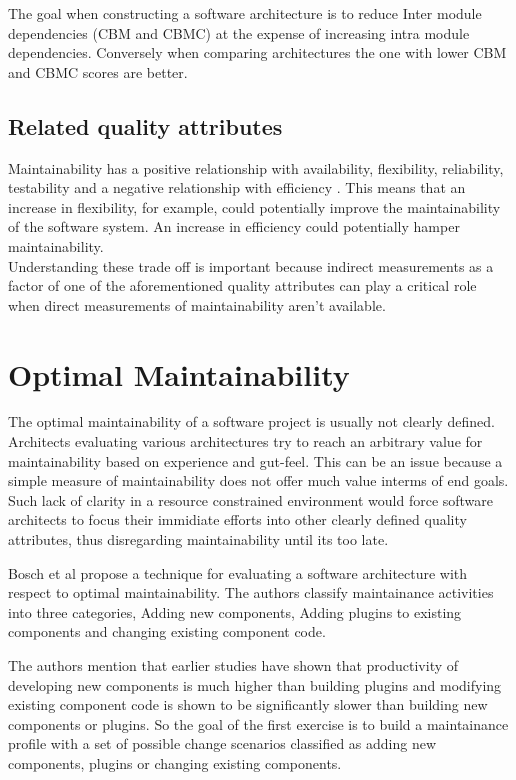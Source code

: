 \documentclass[15pt]{article}
\begin{document}
The goal when constructing a software architecture is to reduce Inter module dependencies (CBM and CBMC) at the expense of increasing intra module dependencies. Conversely when comparing architectures the one with lower CBM and CBMC scores are better.


\subsection{Related quality attributes}
Maintainability has a positive relationship with availability, flexibility, reliability, testability and a negative relationship with efficiency \cite{karl_software_2003}. This means that an increase in flexibility, for example, could potentially improve the maintainability of the software system. An increase in efficiency could potentially hamper maintainability.\\

Understanding these trade off is important because indirect measurements as a factor of one of the aforementioned quality attributes can play a critical role when direct measurements of maintainability aren't available.

\section{Optimal Maintainability}

The optimal maintainability of a software project is usually not clearly defined. Architects evaluating various architectures try to reach an arbitrary value for maintainability based on experience and gut-feel. This can be an issue because a simple measure of maintainability does not offer much value interms of end goals. Such lack of clarity in a resource constrained environment would force software architects to focus their immidiate efforts into other clearly defined quality attributes, thus disregarding maintainability until its too late.

Bosch et al \cite{bosch_assessing_2001} propose a technique for evaluating a software architecture with respect to optimal maintainability. The authors classify maintainance activities into three categories, Adding new components, Adding plugins to existing components and changing existing component code.

The authors mention that earlier studies \cite{henry_quantitative_1997} \cite{maxwell_software_1996} have shown that productivity of developing new components is much higher than building plugins and modifying existing component code is shown to be significantly slower than building new components or plugins. So the goal of the first exercise is to build a maintainance profile with a set of possible change scenarios classified as adding new components, plugins or changing existing components. 
\end{document}
